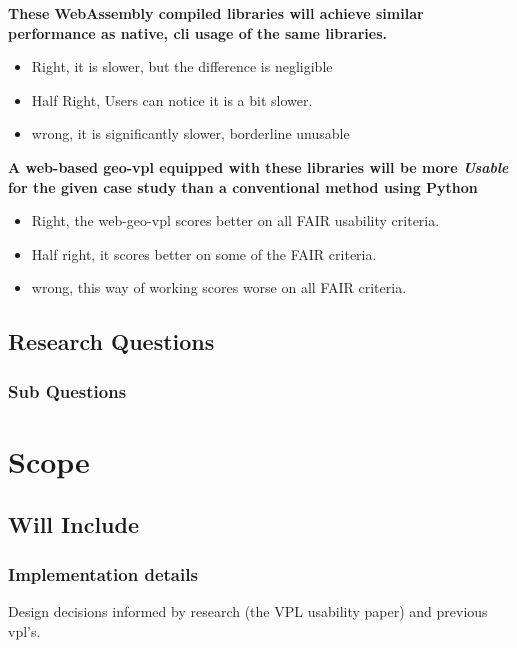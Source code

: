 \textbf{These WebAssembly compiled libraries will achieve similar performance as native, cli usage of the same libraries.}
\begin{itemize}
    \item Right, it is slower, but the difference is negligible 
    \item Half Right, Users can notice it is a bit slower.
    \item wrong, it is significantly slower, borderline unusable  
\end{itemize}

\textbf{A web-based geo-vpl equipped with these libraries will be more \emph{Usable} for the given case study than a conventional method using Python}

\begin{itemize}
    \item Right, the web-geo-vpl scores better on all FAIR usability criteria.
    \item Half right, it scores better on some of the FAIR criteria.
    \item wrong, this way of working scores worse on all FAIR criteria.
\end{itemize}


\subsection{Research Questions}



\subsubsection*{Sub Questions}



\section{Scope}


\subsection{Will Include}




\subsubsection*{Implementation details}
Design decisions informed by research (the VPL usability paper) and previous vpl's.

